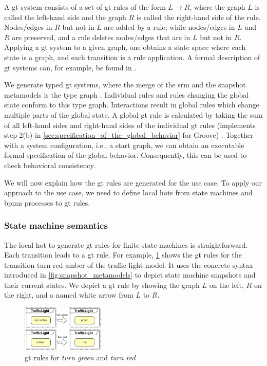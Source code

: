 \documentclass{jot}
\begin{document}
A \gls*{gt} system consists of a set of \gls*{gt} rules of the form $L \to R$, where the graph $L$ is called the left-hand side and the graph $R$ is called the right-hand side of the rule.
Nodes/edges in $R$ but not in $L$ are added by a rule, while nodes/edges in $L$ and $R$ are preserved, and a rule deletes nodes/edges that are in $L$ but not in $R$.
Applying a \gls*{gt} system to a given graph, one obtains a state space where each state is a graph, and each transition is a rule application.
A formal description of \gls*{gt} systems can, for example, be found in \cite{ehrigFundamentalsAlgebraicGraph2006}. %

We generate typed \gls*{gt} systems, where the merge of the \gls*{srm} and the snapshot metamodels is the type graph \cite{krauterArtifactsBehavioralConsistency2022}.
Individual rules and rules changing the global state conform to this type graph.
Interactions result in global rules which change multiple parts of the global state.
A global \gls*{gt} rule is calculated by taking the sum of all left-hand sides and right-hand sides of the individual \gls*{gt} rules (implements step 2(b) in \cref{sec:specification_of_the_global_behavior} for Groove) \cite[Definition 3.2.7]{baldanConcurrentSemanticsAlgebraic1999}.
Together with a system configuration, i.e., a start graph, we can obtain an executable formal specification of the global behavior.
Consequently, this can be used to check behavioral consistency.

We will now explain how the \gls*{gt} rules are generated for the use case.
To apply our approach to the use case, we need to define local \gls*{hot}s from state machines and \gls*{bpmn} processes to \gls*{gt} rules.


\subsubsection{State machine semantics}
The local \gls*{hot} to generate \gls*{gt} rules for finite state machines is straightforward.
Each transition leads to a \gls*{gt} rule.
For example, \cref{fig:sm_rule} shows the \gls*{gt} rules for the transition \textsf{turn red-amber} of the traffic light model.
It uses the concrete syntax introduced in \cref{fig:snapshot_metamodels} to depict state machine snapshots and their current states.
We depict a \gls*{gt} rule by showing the graph $L$ on the left, $R$ on the right, and a named white arrow from $L$ to $R$.

\begin{figure}[h]
    \centering
    \includegraphics[width=0.35\textwidth]{figures/sm_rule.pdf}
    \caption{\gls*{gt} rules for \emph{turn green} and \emph{turn red}}
    \label{fig:sm_rule}
\end{figure}
\end{document}
